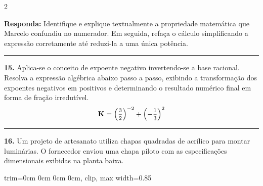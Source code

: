 \documentclass[twoside, 10pt, a4paper]{article}
\newlength{\espacoPreQuestao}\setlength{\espacoPreQuestao}{0.1cm}
\newlength{\espacoQuestao}\setlength{\espacoQuestao}{0.2cm}
\newcommand{\larguraTikz}{0.85\linewidth}
\begin{document}
\begin{multicols*}{2}
\begin{boxresponda}
\textbf{Responda:} Identifique e explique textualmente a propriedade matemática que Marcelo confundiu no numerador. Em seguida, refaça o cálculo simplificando a expressão corretamente até reduzi-la a uma única potência.
\end{boxresponda}
\par\vspace{\espacoQuestao}
\noindent\textcolor{CorLinha}{\rule{\linewidth}{0.5pt}} 
\par\vspace{\espacoPreQuestao}
\textbf{15.} Aplica-se o conceito de expoente negativo invertendo-se a base racional. Resolva a expressão algébrica abaixo passo a passo, exibindo a transformação dos expoentes negativos em positivos e determinando o resultado numérico final em forma de fração irredutível.
$$ \textbf{K} = \left( \mfrac{3}{2} \right)^{-2} + \left( -\mfrac{1}{3} \right)^{2} $$
\par\vspace{\espacoQuestao}

\noindent\textcolor{CorLinha}{\rule{\linewidth}{0.5pt}} 
\par\vspace{\espacoPreQuestao}
\textbf{16.} Um projeto de artesanato utiliza chapas quadradas de acrílico para montar luminárias. O fornecedor enviou uma chapa piloto com as especificações dimensionais exibidas na planta baixa.
\par\vspace{0.3cm}
\begin{center}
\begin{adjustbox}{trim=0cm 0cm 0cm 0cm, clip, max width=\larguraTikz}
\end{adjustbox}
\end{center}
\end{multicols*}
\end{document}
